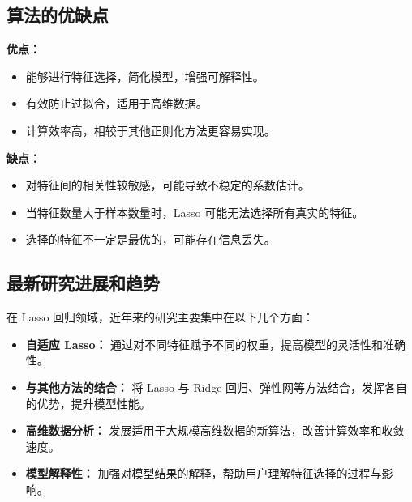 \subsection*{算法的优缺点}
\textbf{优点：}
\begin{itemize}
    \item 能够进行特征选择，简化模型，增强可解释性。
    \item 有效防止过拟合，适用于高维数据。
    \item 计算效率高，相较于其他正则化方法更容易实现。
\end{itemize}

\textbf{缺点：}
\begin{itemize}
    \item 对特征间的相关性较敏感，可能导致不稳定的系数估计。
    \item 当特征数量大于样本数量时，Lasso 可能无法选择所有真实的特征。
    \item 选择的特征不一定是最优的，可能存在信息丢失。
\end{itemize}

\subsection*{最新研究进展和趋势}
在 Lasso 回归领域，近年来的研究主要集中在以下几个方面：
\begin{itemize}
    \item \textbf{自适应 Lasso：} 通过对不同特征赋予不同的权重，提高模型的灵活性和准确性。
    \item \textbf{与其他方法的结合：} 将 Lasso 与 Ridge 回归、弹性网等方法结合，发挥各自的优势，提升模型性能。
    \item \textbf{高维数据分析：} 发展适用于大规模高维数据的新算法，改善计算效率和收敛速度。
    \item \textbf{模型解释性：} 加强对模型结果的解释，帮助用户理解特征选择的过程与影响。
\end{itemize}


